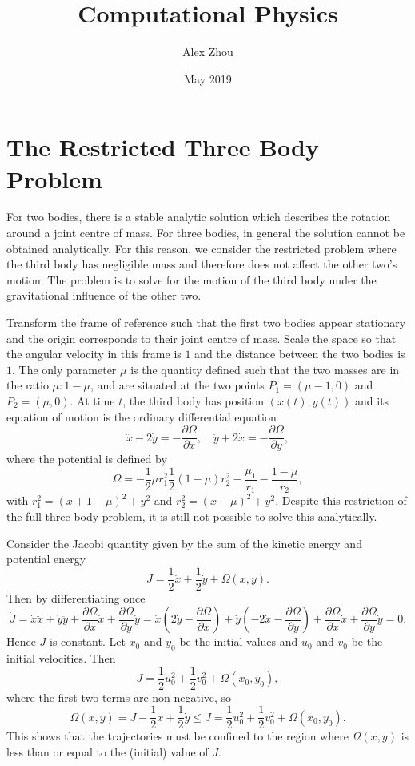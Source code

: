 \documentclass{article}
\title{Computational Physics}
\author{Alex Zhou}
\date{May 2019}
\newcommand{\pder}[2][]{\frac{\partial#1}{\partial#2}}
\begin{document}
\maketitle

\section{The Restricted Three Body Problem}

For two bodies, there is a stable analytic solution which describes the rotation around a joint centre of mass. For three bodies, in general the solution cannot be obtained analytically. For this reason, we consider the restricted problem where the third body has negligible mass and therefore does not affect the other two's motion. The problem is to solve for the motion of the third body under the gravitational influence of the other two.

Transform the frame of reference such that the first two bodies appear stationary and the origin corresponds to their joint centre of mass. Scale the space so that the angular velocity in this frame is \(1\) and the distance between the two bodies is \(1\). The only parameter \(\mu\) is the quantity defined such that the two masses are in the ratio \(\mu : 1 - \mu\), and are situated at the two points \(P_1 = (\mu - 1, 0)\) and \(P_2 = (\mu, 0)\). At time \(t\), the third body has position \((x(t), y(t))\) and its equation of motion is the ordinary differential equation
\[ \ddot{x} - 2\dot{y} = -\pder[\Omega]{x}, \quad \ddot{y} + 2\dot{x} = -\pder[\Omega]{y}, \]
where the potential is defined by
\[ \Omega = -\frac{1}{2}\mu r_1^2 \frac{1}{2}(1-\mu)r_2^2 - \frac{\mu_1}{r_1} - \frac{1-\mu}{r_2}, \]
with \(r_1^2 = (x+1-\mu)^2 + y^2\) and \(r_2^2 = (x-\mu)^2 + y^2\). Despite this restriction of the full three body problem, it is still not possible to solve this analytically.

Consider the Jacobi quantity given by the sum of the kinetic energy and potential energy
\[ J = \frac{1}{2}\dot{x} + \frac{1}{2}\dot{y} + \Omega(x, y). \]
Then by differentiating once
\[ \dot{J} = \dot{x}\ddot{x} + \dot{y}\ddot{y} + \pder[\Omega]{x}\dot{x} + \pder[\Omega]{y}\dot{y} = \dot{x}\left(2\dot{y} -\pder[\Omega]{x}\right) + \dot{y}\left(-2\dot{x} -\pder[\Omega]{y}\right) + \pder[\Omega]{x}\dot{x} + \pder[\Omega]{y}\dot{y} = 0. \]
Hence \(J\) is constant. Let \(x_0\) and \(y_0\) be the initial values and \(u_0\) and \(v_0\) be the initial velocities. Then
\[ J = \frac{1}{2}u_0^2 + \frac{1}{2}v_0^2 + \Omega(x_0, y_0), \]
where the first two terms are non-negative, so
\[ \Omega(x, y) = J - \frac{1}{2}\dot{x }+ \frac{1}{2}\dot{y} \leq J = \frac{1}{2}u_0^2 + \frac{1}{2}v_0^2 + \Omega(x_0, y_0). \]
This shows that the trajectories must be confined to the region where \(\Omega(x,y)\) is less than or equal to the (initial) value of \(J\).
\end{document}

